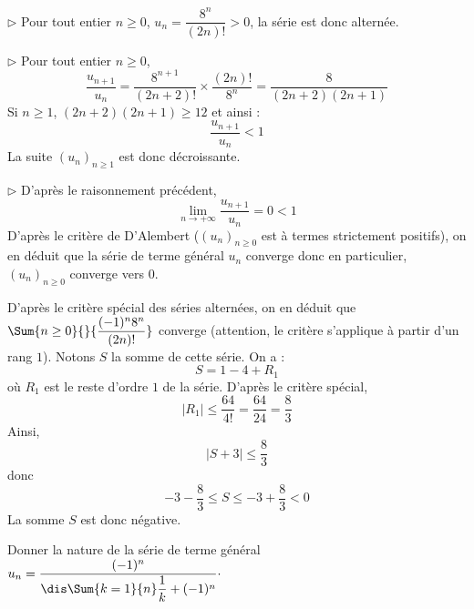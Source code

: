 \documentclass[a4paper,twoside,french,10pt]{VcCours}
\begin{document}
\noindent $\rhd$ Pour tout entier $n \geq 0$, $u_n = \dfrac{ 8^n}{(2n)!} > 0$, la série est donc alternée. 

\medskip

\noindent $\rhd$ Pour tout entier $n \geq 0$,
$$ \dfrac{u_{n+1}}{u_n} = \dfrac{8^{n+1}}{(2n+2)!} \times \dfrac{(2n)!}{8^n} =\dfrac{8}{(2n+2)(2n+1)}$$
Si $n \geq 1$, $(2n+2)(2n+1) \geq 12$ et ainsi :
$$  \dfrac{u_{n+1}}{u_n} < 1$$
La suite $(u_n)_{n \geq 1}$ est donc décroissante.

\medskip

\noindent $\rhd$ D'après le raisonnement précédent,
$$ \lim_{n \rightarrow + \infty}  \dfrac{u_{n+1}}{u_n} = 0 <1$$
D'après le critère de D'Alembert ($(u_n)_{n \geq 0}$ est à termes strictement positifs), on en déduit que la série de terme général $u_n$ converge donc en particulier, $(u_n)_{n \geq 0}$ converge vers $0$.

\medskip

\noindent D'après le critère spécial des séries alternées, on en déduit que $\Sum{n \geq 0}{} {\dfrac{( - 1)^n 8^n}{(2n)!}}$ converge (attention, le critère s'applique à partir d'un rang $1$). Notons $S$ la somme de cette série. On a :
$$ S= 1 - 4 + R_1$$
où $R_1$ est le reste d'ordre $1$ de la série. D'après le critère spécial, 
$$ \vert R_1 \vert \leq \dfrac{64}{4!} = \dfrac{64}{24} = \dfrac{8}{3}$$
Ainsi, 
$$ \vert S + 3 \vert \leq \dfrac{8}{3}$$
donc 
$$ -3- \dfrac{8}{3} \leq S \leq -3 + \dfrac{8}{3} <0$$
La somme $S$ est donc négative.

\medskip

\begin{Exercice}{} Donner la nature de la série de terme général $u_n = \dfrac{(-1)^n}{\dis \Sum{k=1}{n} \dfrac{1}{k} + (-1)^n} \cdot$
\end{Exercice}
\end{document}
